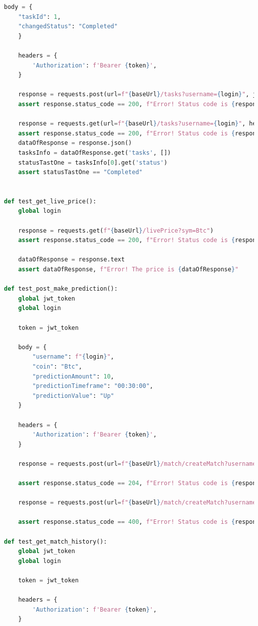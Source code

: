 \documentclass[a4paper, 12pt]{article}
\begin{document}
\begin{lstlisting}[language=python, caption={Код для тестирования API}]
    body = {
    "taskId": 1,
    "changedStatus": "Completed"
    }

    headers = {
        'Authorization': f'Bearer {token}',
    }    

    response = requests.post(url=f"{baseUrl}/tasks?username={login}", json= body, headers=headers)
    assert response.status_code == 200, f"Error! Status code is {response.status_code}"

    response = requests.get(url=f"{baseUrl}/tasks?username={login}", headers=headers)
    assert response.status_code == 200, f"Error! Status code is {response.status_code}"
    dataOfResponse = response.json()
    tasksInfo = dataOfResponse.get('tasks', [])
    statusTastOne = tasksInfo[0].get('status')
    assert statusTastOne == "Completed"

    
def test_get_live_price():
    global login

    response = requests.get(f"{baseUrl}/livePrice?sym=Btc")
    assert response.status_code == 200, f"Error! Status code is {response.status_code}"

    dataOfResponse = response.text
    assert dataOfResponse, f"Error! The price is {dataOfResponse}"

def test_post_make_prediction():
    global jwt_token
    global login

    token = jwt_token

    body = {
        "username": f"{login}",
        "coin": "Btc",
        "predictionAmount": 10,
        "predictionTimeframe": "00:30:00",
        "predictionValue": "Up"
    }

    headers = {
        'Authorization': f'Bearer {token}',
    }    

    response = requests.post(url=f"{baseUrl}/match/createMatch?username={login}", json=body, headers=headers)

    assert response.status_code == 204, f"Error! Status code is {response.status_code}"

    response = requests.post(url=f"{baseUrl}/match/createMatch?username={login}", json=body, headers=headers)

    assert response.status_code == 400, f"Error! Status code is {response.status_code}"

def test_get_match_history():
    global jwt_token
    global login

    token = jwt_token

    headers = {
        'Authorization': f'Bearer {token}',
    }    


\end{lstlisting}
\end{document}
